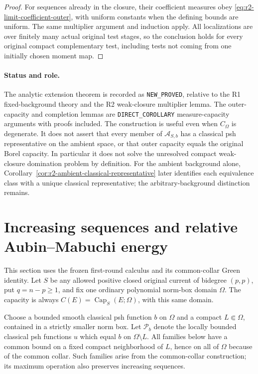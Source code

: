 \documentclass[11pt,a4paper]{article}
\numberwithin{equation}{section}
\theoremstyle{definition}
\theoremstyle{remark}
\begin{document}
\begin{proof}
For sequences already in the closure, their coefficient measures
obey \eqref{eq:r2-limit-coefficient-outer}, with uniform constants
when the defining bounds are uniform. The same multiplier
argument and induction apply. All localizations are over finitely
many actual original test stages, so the conclusion holds for
every original compact complementary test, including tests not
coming from one initially chosen moment map.
\end{proof}

\paragraph{Status and role.}
The analytic extension theorem is recorded as \texttt{NEW\_PROVED},
relative to the R1 fixed-background theory and the R2 weak-closure
multiplier lemma. The outer-capacity and completion lemmas are
\texttt{DIRECT\_COROLLARY} measure-capacity arguments with proofs
included. The construction is useful even when $C_\Omega$ is
degenerate. It does not assert that every member of
$\mathcal A_{S,b}$ has a classical psh representative on the
ambient space, or that outer capacity equals the original Borel
capacity. In particular it does not solve the unresolved compact
weak-closure domination problem by definition. For the ambient
background alone, Corollary~\ref{cor:r2-ambient-classical-representative}
later identifies each equivalence class with a unique classical
representative; the arbitrary-background distinction remains.



\section{Increasing sequences and relative Aubin--Mabuchi energy}
\label{sec:r2-increasing-energy}

This section uses the frozen first-round calculus and its common-collar
Green identity. Let $S$ be any allowed positive closed original current
of bidegree $(p,p)$, put $q=n-p\geq1$, and fix one ordinary polynomial
norm-box domain $\Omega$. The capacity is always
$C(E)=\operatorname{Cap}_S(E;\Omega)$, with this same domain.

Choose a bounded smooth classical psh function $b$ on $\Omega$ and a compact
$L\Subset\Omega$, contained in a strictly smaller norm box. Let
$\mathcal P_b$ denote the locally bounded classical psh functions $u$
which equal $b$ on $\Omega\setminus L$. All families below have a common
bound on a fixed compact neighborhood of $L$, hence on all of $\Omega$
because of the common collar. Such families arise from
the common-collar construction; its maximum operation also preserves
increasing sequences.
\end{document}
